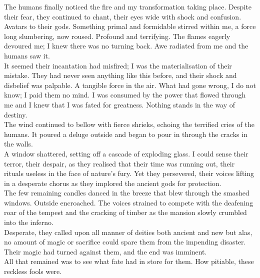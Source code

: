 
The humans finally noticed the fire and my transformation taking place. Despite their fear, they continued to chant, their eyes wide with shock and confusion. Avatars to their gods. Something primal and formidable stirred within me, a force long slumbering, now roused. Profound and terrifying. The flames eagerly devoured me; I knew there was no turning back. Awe radiated from me and the humans saw it. \\
It seemed their incantation had misfired; I was the materialisation of their mistake. They had never seen anything like this before, and their shock and disbelief was palpable. A tangible force in the air. What had gone wrong, I do not know; I paid them no mind. I was consumed by the power that flowed through me and I knew that I was fated for greatness. Nothing stands in the way of destiny. \\

The wind continued to bellow with fierce shrieks, echoing the terrified cries of the humans. It poured a deluge outside and began to pour in through the cracks in the walls. \\
A window shattered, setting off a cascade of exploding glass. I could sense their terror, their despair, as they realised that their time was running out, their rituals useless in the face of nature's fury. Yet they persevered, their voices lifting in a desperate chorus as they implored the ancient gods for protection. \\
The few remaining candles danced in the breeze that blew through the smashed windows. Outside encroached. The voices strained to compete with the deafening roar of the tempest and the cracking of timber as the mansion slowly crumbled into the inferno. \\
Desperate, they called upon all manner of deities both ancient and new but alas, no amount of magic or sacrifice could spare them from the impending disaster. Their magic had turned against them, and the end was imminent. \\
All that remained was to see what fate had in store for them. How pitiable, these reckless fools were. \\

